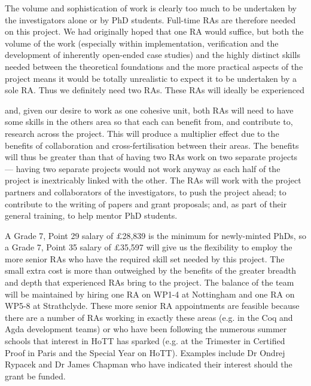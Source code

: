 \documentclass[a4paper,11pt]{article}
\begin{document}
The volume and sophistication of work is clearly too much to be
undertaken by the investigators alone or by PhD students.  Full-time
RAs are therefore needed on this project. We had originally hoped that
one RA would suffice, but both the volume of the work (especially
within implementation, verification and the development of inherently
open-ended case studies) and the highly distinct skills needed between
the theoretical foundations and the more practical aspects of the
project means it would be totally unrealistic to expect it to be
undertaken by a sole RA. Thus we definitely need two RAs. These RAs
will ideally be experienced


 and, given
our desire to work as one cohesive unit, both RAs will need to have
some skills in the others area so that each can benefit from, and
contribute to, research across the project. This will produce a
multiplier effect due to the benefits of collaboration and
cross-fertilisation between their areas. The benefits will thus be
greater than that of having two RAs work on two separate projects ---
having two separate projects would not work anyway as each half of the
project is inextricably linked with the other.  The RAs will work with
the project partners and collaborators of the investigators, to push
the project ahead; to contribute to the writing of papers and grant
proposals; and, as part of their general training, to help mentor PhD
students. 


A Grade 7, Point 29 salary of $\pounds$28,839 is the minimum
for newly-minted PhDs, so a Grade 7, Point 35 salary of
$\pounds$35,597 will give us the flexibility to employ the more senior
RAs who have the required skill set needed by this project. The
small extra cost is more than outweighed by the benefits of the
greater breadth and depth that experienced RAs bring to the
project. The balance of the team will be maintained by hiring one RA
on WP1-4 at Nottingham and one RA on WP5-8 at Strathclyde. These more
senior RA appointments are feasible because there are a number of RAs
working in exactly these areas (e.g. in the Coq and Agda development
teams) or who have been following the numerous summer schools that
interest in HoTT has sparked (e.g. at the Trimester in Certified Proof
in Paris and the Special Year on HoTT). Examples include Dr Ondrej
Rypacek and Dr James Chapman who have indicated their interest should the grant be funded.


\vspace{0.02in}
\end{document}
